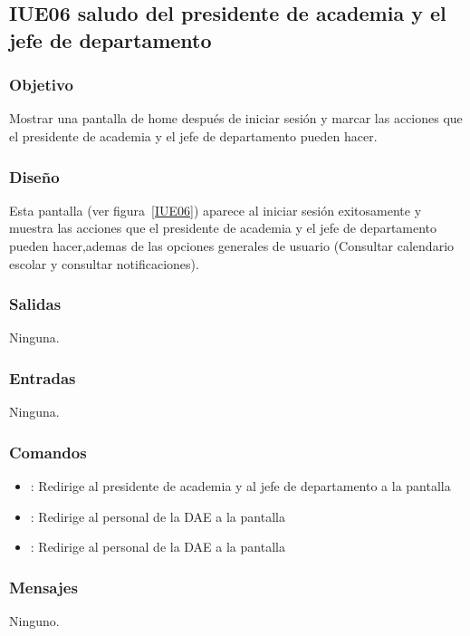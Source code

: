 \subsection{IUE06 saludo del presidente de academia y el jefe de departamento}

\subsubsection{Objetivo}
Mostrar una pantalla de home después de iniciar sesión y marcar las acciones que el presidente de academia y el jefe de departamento pueden hacer.

\subsubsection{Diseño}
Esta pantalla  (ver figura~\ref{IUE06}) aparece al iniciar sesión exitosamente y muestra las acciones que el presidente de academia y el jefe de departamento pueden hacer,ademas de las opciones generales de usuario (Consultar calendario escolar y consultar notificaciones). 


\subsubsection{Salidas}
 
Ninguna.

\subsubsection{Entradas}
Ninguna.

\subsubsection{Comandos}
\begin{itemize}
	\item {}: Redirige al presidente de academia y al jefe de departamento a la pantalla 
	\item {}: Redirige al personal de la DAE a la pantalla 
	\item {}: Redirige al personal de la DAE a la pantalla 
	
\end{itemize}

\subsubsection{Mensajes}

\begin{Citemize}
	\item Ninguno.
\end{Citemize}
